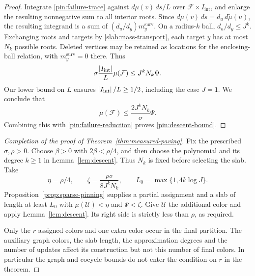 \begin{proof}
Integrate \eqref{pin:failure-trace} against $d\mu(v)\,ds/L$ over
$\mathcal F\times I_{\mathrm{int}}$, and enlarge the resulting
nonnegative sum to all interior roots.  Since
$d\mu(v)\,ds=d_u\,d\widetilde\mu(u)$, the resulting integrand is a
sum of $(d_u/d_y)m_y^{\mathrm{surv}}$.  On a radius-$k$ ball,
$d_u/d_y\leq J^k$.  Exchanging roots and targets by
\eqref{slab:mass-transport}, each target $y$ has at most $N_k$
possible roots.  Deleted vertices may be retained as locations for
the enclosing-ball relation, with $m_y^{\mathrm{surv}}=0$ there.
Thus
\[
 \sigma\frac{\left|I_{\mathrm{int}}\right|}L\mu(\mathcal F)
 \leq J^kN_k\Psi.
\]
Our lower bound on $L$ ensures
$\left|I_{\mathrm{int}}\right|/L\geq1/2$, including the case $J=1$.
We conclude that
\[
 \mu(\mathcal F)\leq\frac{2J^kN_k}{\sigma}\Psi.
\]
Combining this with \eqref{pin:failure-reduction} proves
\eqref{pin:descent-bound}.
\end{proof}

\begin{proof}[Completion of the proof of Theorem~\ref{thm:measured-paving}]
Fix the prescribed $\sigma,\rho>0$.  Choose $\beta>0$ with
$2\beta<\rho/4$, and then choose the polynomial and its degree
$k\geq1$ in Lemma~\ref{lem:descent}.  Thus $N_k$ is fixed before
selecting the slab.  Take
\[
 \eta=\rho/4,\qquad
 \zeta=\frac{\rho\sigma}{8J^kN_k},\qquad
 L_0=\max\{1,4k\log J\}.
\]
Proposition~\ref{prop:sparse-pinning} supplies a partial assignment and
a slab of length at least $L_0$ with
$\mu(\mathcal U)<\eta$ and $\Psi<\zeta$.  Give $\mathcal U$ the
additional color and apply Lemma~\ref{lem:descent}.  Its right side is
strictly less than $\rho$, as required.

Only the $r$ assigned colors and one extra color occur in the final
partition.  The auxiliary graph colors, the slab length, the
approximation degrees and the number of updates affect its
construction but not this number of final colors.  In particular the
graph and cocycle bounds do not enter the condition on $r$ in the
theorem.
\end{proof}
